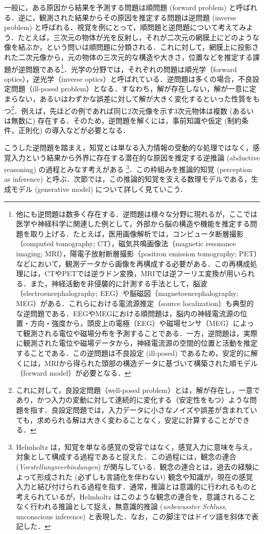 \documentclass[titlepage]{ltjsbook}
\begin{document}
一般に，ある原因から結果を予測する問題は順問題 (forward problem) と呼ばれる．逆に，観測された結果からその原因を推定する問題は逆問題 (inverse problem) と呼ばれる．視覚を例にとって，順問題と逆問題について考えてみよう．たとえば，三次元の物体が光を反射し，それが二次元の網膜上にどのような像を結ぶか，という問いは順問題に分類される．これに対して，網膜上に投影された二次元像から，元の物体の三次元的な構造や大きさ，位置などを推定する課題が逆問題である\footnote{他にも逆問題は数多く存在する．逆問題は様々な分野に現れるが，ここでは医学や神経科学に関連した例として，外部から脳の構造や機能を推定する問題を取り上げる．たとえば，医用画像解析では，コンピュータ断層撮影（computed tomography; CT），磁気共鳴画像法（magnetic resonance imaging; MRI），陽電子放射断層撮影（positron emission tomography; PET）などにおいて，観測データから画像を再構成する必要がある．この再構成処理には，CTやPETでは逆ラドン変換，MRIでは逆フーリエ変換が用いられる．また，神経活動を非侵襲的に計測する手法として，脳波（electroencephalography; EEG）や脳磁図（magnetoencephalography; MEG）がある．これらにおける電流源推定（source localization）も典型的な逆問題である．EEGやMEGにおける順問題は，脳内の神経電流源の位置・方向・強度から，頭皮上の電極（EEG）や磁場センサ（MEG）によって観測される電位や磁場分布を予測することである．一方，逆問題は，実際に観測された電位や磁場データから，神経電流源の空間的位置と活動を推定することである．この逆問題は不良設定 (ill-posed) であるため，安定的に解くには，MRIから得られた頭部の構造データに基づいて構築された順モデル（forward model）が必要となる．}．光学の分野では，それぞれの問題は順光学（forward optics），逆光学（inverse optics）と呼ばれている．逆問題は多くの場合，不良設定問題（ill-posed problem）となる．すなわち，解が存在しない，解が一意に定まらない，あるいはわずかな誤差に対して解が大きく変化するといった性質をもつ\footnote{これに対して，良設定問題（well-posed problem）とは，解が存在し，一意であり，かつ入力の変動に対して連続的に変化する（安定性をもつ）ような問題を指す．良設定問題では，入力データに小さなノイズや誤差が含まれていても，求められる解は大きく変わることなく，安定に計算することができる．}．例えば，先ほどの例であれば同じ2次元像を示す3次元物体は複数 (あるいは無数に) 存在する．そのため，逆問題を解くには，事前知識や仮定 (制約条件，正則化) の導入などが必要となる．

こうした逆問題を踏まえ，知覚とは単なる入力情報の受動的な処理ではなく，感覚入力という結果から外界に存在する潜在的な原因を推定する逆推論 (abductive reasoning) の過程とみなす考えがある \citep{helmholtz1867, mumford1992computational, kawato1993forward, friston2003learning}\footnote{Helmholtz は，知覚を単なる感覚の受容ではなく，感覚入力に意味を与え，対象として構成する過程であると捉えた．この過程には，観念の連合 (\textit{Vorstellungsverbindungen}) が関与している．観念の連合とは，過去の経験によって形成された (必ずしも言語化を伴わない) 観念や知識が，現在の感覚入力と結び付けられる過程を指す．通常，推論とは意識的に行われるものと考えられているが，Helmholtz はこのような観念の連合を，意識されることなく行われる推論として捉え，無意識的推論 (\textit{unbewusster Schluss}, unconscious inference)  と表現した．なお，この脚注ではドイツ語を斜体で表記した．}．この枠組みを推論的知覚 (perception as inference) と呼ぶ．次節では，この推論的知覚を支える数理モデルである，生成モデル (generative model) について詳しく見ていこう．
\end{document}
